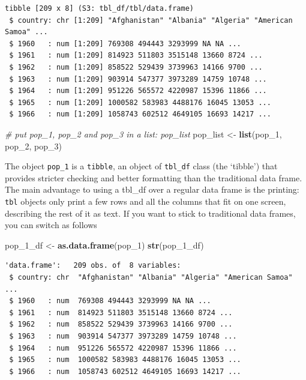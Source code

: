 \documentclass[
]{book}
\newenvironment{Shaded}{\begin{snugshade}}{\end{snugshade}}
\newcommand{\CommentTok}[1]{\textcolor[rgb]{0.56,0.35,0.01}{\textit{#1}}}
\newcommand{\DecValTok}[1]{\textcolor[rgb]{0.00,0.00,0.81}{#1}}
\newcommand{\KeywordTok}[1]{\textcolor[rgb]{0.13,0.29,0.53}{\textbf{#1}}}
\newcommand{\NormalTok}[1]{#1}
\newcommand{\StringTok}[1]{\textcolor[rgb]{0.31,0.60,0.02}{#1}}
\begin{document}
\begin{verbatim}
tibble [209 x 8] (S3: tbl_df/tbl/data.frame)
 $ country: chr [1:209] "Afghanistan" "Albania" "Algeria" "American Samoa" ...
 $ 1960   : num [1:209] 769308 494443 3293999 NA NA ...
 $ 1961   : num [1:209] 814923 511803 3515148 13660 8724 ...
 $ 1962   : num [1:209] 858522 529439 3739963 14166 9700 ...
 $ 1963   : num [1:209] 903914 547377 3973289 14759 10748 ...
 $ 1964   : num [1:209] 951226 565572 4220987 15396 11866 ...
 $ 1965   : num [1:209] 1000582 583983 4488176 16045 13053 ...
 $ 1966   : num [1:209] 1058743 602512 4649105 16693 14217 ...
\end{verbatim}

\begin{Shaded}
\begin{Highlighting}[]
\CommentTok{# put pop_1, pop_2 and pop_3 in a list: pop_list}
\NormalTok{pop_list <-}\StringTok{ }\KeywordTok{list}\NormalTok{(pop_}\DecValTok{1}\NormalTok{, pop_}\DecValTok{2}\NormalTok{, pop_}\DecValTok{3}\NormalTok{)}
\end{Highlighting}
\end{Shaded}

The object \texttt{pop\_1} is a \texttt{tibble}, an object of \texttt{tbl\_df} class (the `tibble') that provides stricter checking and better formatting than the traditional data frame. The main advantage to using a tbl\_df over a regular data frame is the printing: \texttt{tbl} objects only print a few rows and all the columns that fit on one screen, describing the rest of it as text. If you want to stick to traditional data frames, you can switch as follows

\begin{Shaded}
\begin{Highlighting}[]
\NormalTok{pop_}\DecValTok{1}\NormalTok{_df <-}\StringTok{ }\KeywordTok{as.data.frame}\NormalTok{(pop_}\DecValTok{1}\NormalTok{)}
\KeywordTok{str}\NormalTok{(pop_}\DecValTok{1}\NormalTok{_df)}
\end{Highlighting}
\end{Shaded}

\begin{verbatim}
'data.frame':	209 obs. of  8 variables:
 $ country: chr  "Afghanistan" "Albania" "Algeria" "American Samoa" ...
 $ 1960   : num  769308 494443 3293999 NA NA ...
 $ 1961   : num  814923 511803 3515148 13660 8724 ...
 $ 1962   : num  858522 529439 3739963 14166 9700 ...
 $ 1963   : num  903914 547377 3973289 14759 10748 ...
 $ 1964   : num  951226 565572 4220987 15396 11866 ...
 $ 1965   : num  1000582 583983 4488176 16045 13053 ...
 $ 1966   : num  1058743 602512 4649105 16693 14217 ...
\end{verbatim}
\end{document}
